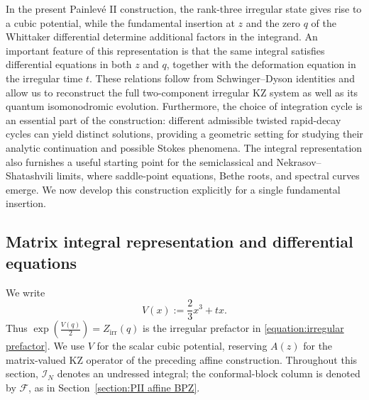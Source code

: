 \documentclass[a4paper,11pt]{article}
\newcommand{\cF}{\mathcal{F}}
\numberwithin{equation}{section}
\begin{document}
In the present Painlev\'e II construction, the rank-three irregular state gives rise to a cubic potential, while the fundamental insertion at $z$ and the zero $q$ of the Whittaker differential determine additional factors in the integrand. An important feature of this representation is that the same integral satisfies differential equations in both $z$ and $q$, together with the deformation equation in the irregular time $t$. These relations follow from Schwinger–Dyson identities and allow us to reconstruct the full two-component irregular KZ system as well as its quantum isomonodromic evolution. Furthermore, the choice of integration cycle is an essential part of the construction: different admissible twisted rapid-decay cycles can yield distinct solutions, providing a geometric setting for studying their analytic continuation and possible Stokes phenomena. The integral representation also furnishes a useful starting point for the semiclassical and Nekrasov–Shatashvili limits, where saddle-point equations, Bethe roots, and spectral curves emerge. We now develop this construction explicitly for a single fundamental insertion.

\subsection{Matrix integral representation and differential equations}
\label{subsection:PII screening integral}
We write
\begin{equation}
	\label{equation:PII A function}
	V(x):=\frac{2}{3}x^{3}+tx.
\end{equation}
Thus $\exp\left(\frac{V(q)}{2}\right)=Z_{\mathrm{irr}}(q)$ is the
irregular prefactor in \eqref{equation:irregular prefactor}.  We use
$V$ for the scalar cubic potential, reserving $A(z)$ for the
matrix-valued KZ operator of the preceding affine construction.  Throughout this section,
$\mathcal{I}_{N}$ denotes an undressed integral; the conformal-block
column is denoted by $\cF$, as in Section~\ref{section:PII affine BPZ}.
\end{document}

